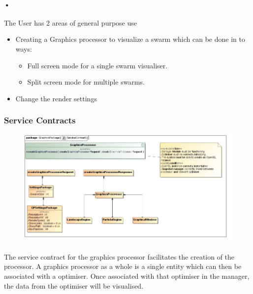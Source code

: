 \documentclass[11pt]{article}
\begin{document}
\paragraph{•}
The User has 2 areas of general purpose use
\begin{itemize}
\item Creating a Graphics processor to visualize a swarm which can be done in to ways:
\begin{itemize}
\item Full screen mode for a single swarm visualiser.
\item Split screen mode for multiple swarms.
\end{itemize}
\item Change the render settings
\end{itemize}

\subsubsection{Service Contracts}
\begin{figure}[h]
\includegraphics[scale=0.45]{GraphicsProcessor/ServiceContract.jpg}
\end{figure}
The service contract for the graphics processor facilitates the creation of the processor. A graphics processor as a whole is a single entity which can then be associated with a optimiser. Once associated with that optimiser in the manager, the data from the optimiser will be visualised. 
\end{document}
